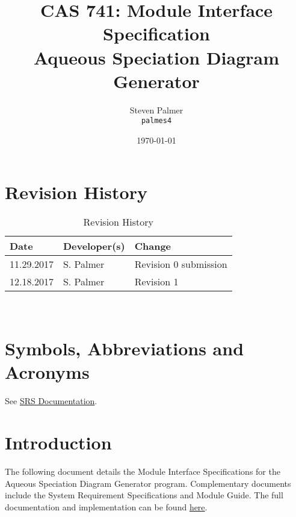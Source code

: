 \documentclass[12pt, titlepage]{article}
\begin{document}

\title{CAS 741: Module Interface Specification\\[10pt]\Large Aqueous Speciation Diagram Generator}
\author{Steven Palmer\\\texttt{palmes4}}
\date{\today}
	
\maketitle


\setcounter{secnumdepth}{0}

\section{Revision History}

\begin{table}[hp]
\caption{Revision History} \label{TblRevisionHistory}
\begin{tabularx}{\textwidth}{llX}
\toprule
\textbf{Date} & \textbf{Developer(s)} & \textbf{Change}\\
\midrule
11.29.2017 & S. Palmer & Revision 0 submission\\
12.18.2017 & S. Palmer & Revision 1\\
\bottomrule
\end{tabularx}
\end{table}

~\newpage

\section{Symbols, Abbreviations and Acronyms}

See \href{https://github.com/palmerst/cas741_sp/blob/master/Doc/SRS/SRS.pdf}{SRS Documentation}.

\newpage

\tableofcontents


\newpage



\setcounter{secnumdepth}{3}

\section{Introduction}

The following document details the Module Interface Specifications for
the Aqueous Speciation Diagram Generator program. Complementary documents include the 
System Requirement Specifications and Module Guide.  The full documentation and 
implementation can be found \href{https://github.com/palmerst/cas741_sp}{here}.
\end{document}
